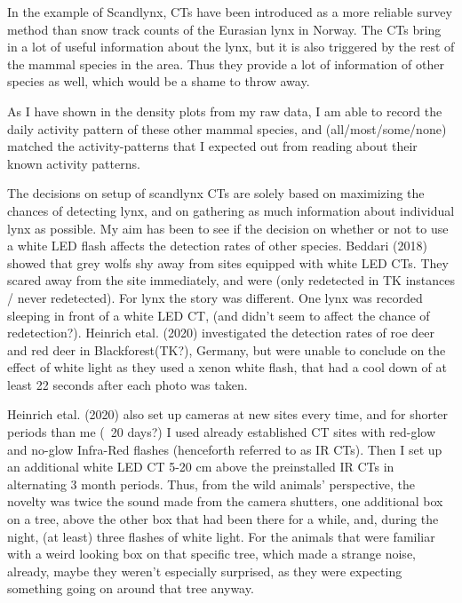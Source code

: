 
In the example of Scandlynx, CTs have been introduced as a more reliable survey method than snow track counts of the Eurasian lynx in Norway. The CTs bring in a lot of useful information about the lynx, but it is also triggered by the rest of the mammal species in the area. Thus they provide a lot of information of other species as well, which would be a shame to throw away.

As I have shown in the density plots from my raw data, I am able to record the daily activity pattern of these other mammal species, and (all/most/some/none) matched the activity-patterns that I expected out from reading about their known activity patterns. %




The decisions on setup of scandlynx CTs are solely based on maximizing the chances of detecting lynx, and on gathering as much information about individual lynx as possible.
My aim has been to see if the decision on whether or not to use a white LED flash affects the detection rates of other species. Beddari (2018) showed that grey wolfs shy away from sites equipped with white LED CTs. They scared away from the site immediately, and were (only redetected in TK instances / never redetected). For lynx the story was different. One lynx was recorded sleeping in front of a white LED CT, (and didn't seem to affect the chance of redetection?).
Heinrich etal. (2020) investigated the detection rates of roe deer and red deer in Blackforest(TK?), Germany, but were unable to conclude on the effect of white light as they used a xenon white flash, that had a cool down of at least 22 seconds after each photo was taken.

Heinrich etal. (2020) also set up cameras at new sites every time, and for shorter periods than me (~20 days?)%
I used already established CT sites with red-glow and no-glow Infra-Red flashes (henceforth referred to as IR CTs). Then I set up an additional white LED CT 5-20 cm above the preinstalled IR CTs in alternating 3 month periods.
Thus, from the wild animals' perspective, the novelty was twice the sound made from the camera shutters, one additional box on a tree, above the other box that had been there for a while, and, during the night, (at least) three flashes of white light.
For the animals that were familiar with a weird looking box on that specific tree, which made a strange noise, already, maybe they weren't especially surprised, as they were expecting something going on around that tree anyway.









